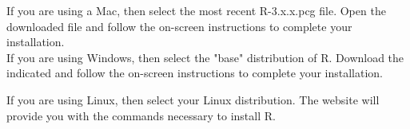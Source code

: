 \documentclass[12pt,letterpaper]{article}
\begin{document}
\begin{enumerate}
		If you are using a Mac, then select the most recent R-3.x.x.pcg file. Open the downloaded file and follow the on-screen instructions to complete your installation.\\
\newpage
		If you are using Windows, then select the "base" distribution of R. Download the indicated and follow the on-screen instructions to complete your installation.\\
		
		If you are using Linux, then select your Linux distribution. The website will provide you with the commands necessary to install R.
	

\end{enumerate}
\end{document}
